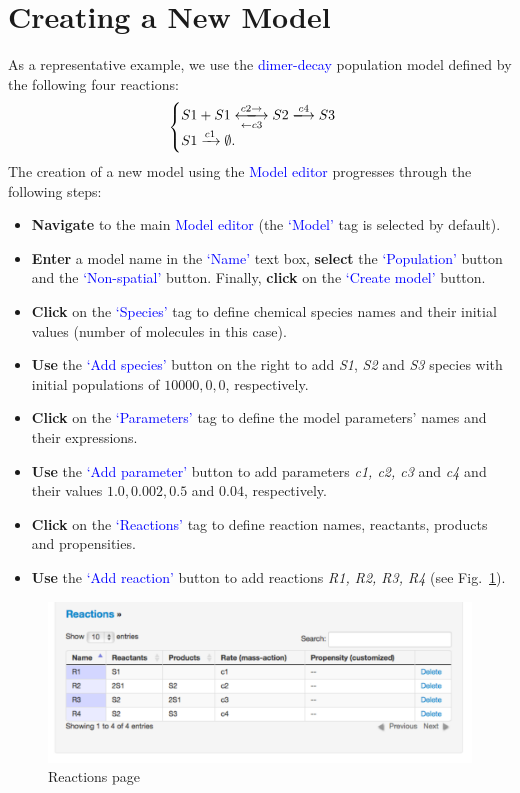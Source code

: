 \section{Creating a New Model}
As a representative example, we use the \textcolor{blue}{dimer-decay} population model defined by the following four reactions:
\[ \begin{cases}
S1 + S1 \xlongleftrightarrow[\leftarrow c3]{c2\rightarrow} S2 \xlongrightarrow{c4} S3 \nonumber \\
S1 \xrightarrow{c1} \emptyset . \nonumber 
\end{cases} \]
The creation of a new model using the \textcolor{blue}{Model editor} progresses through the following steps:
\begin{itemize}
\item \textbf{Navigate} to the main \textcolor{blue}{Model editor} (the \textcolor{blue}{`Model'} tag is selected by default).
\item \textbf{Enter} a model name in the \textcolor{blue}{`Name'} text box, \textbf{select} the \textcolor{blue}{`Population'} button and the  \textcolor{blue}{`Non-spatial'} button. Finally, \textbf{click} on the \textcolor{blue}{`Create model'}  button.
 \item \textbf{Click} on the \textcolor{blue}{`Species'} tag to define chemical species names and their initial values (number of molecules in this case). 
 \item \textbf{Use} the \textcolor{blue}{`Add species'} button on the right to add \textit{S1}, \textit{S2} and \textit{S3} species with initial populations of $10000, 0, 0$, respectively.
 \item \textbf{Click} on the \textcolor{blue}{`Parameters'} tag to define the model parameters' names and their expressions. 
 \item \textbf{Use} the \textcolor{blue}{`Add parameter'} button to add parameters \textit{c1, c2, c3} and \textit{c4} and their values $1.0, 0.002, 0.5$ and $0.04$, respectively.
 \item \textbf{Click} on the \textcolor{blue}{`Reactions'} tag to define reaction names, reactants, products and propensities.
 \item \textbf{Use} the \textcolor{blue}{`Add reaction'} button to add reactions \textit{R1, R2, R3, R4} (see Fig.~\ref{fig:2}).
\end{itemize}

\begin{figure}[!htb]
\centering
\includegraphics[scale=0.64]{T1/reactions.pdf}
\caption{Reactions page}
\label{fig:2}
\end{figure}

